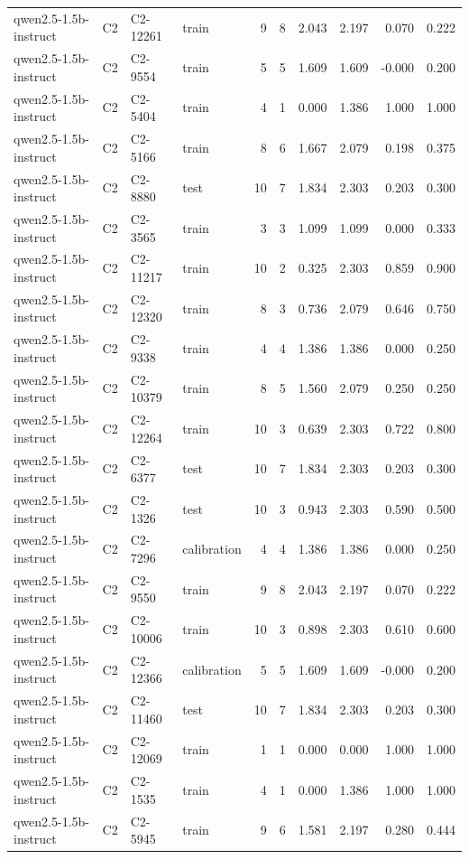 \begin{table}
\begin{tabular}{llllrrrrrr}
qwen2.5-1.5b-instruct & C2 & C2-12261 & train & 9 & 8 & 2.043 & 2.197 & 0.070 & 0.222 \\
qwen2.5-1.5b-instruct & C2 & C2-9554 & train & 5 & 5 & 1.609 & 1.609 & -0.000 & 0.200 \\
qwen2.5-1.5b-instruct & C2 & C2-5404 & train & 4 & 1 & 0.000 & 1.386 & 1.000 & 1.000 \\
qwen2.5-1.5b-instruct & C2 & C2-5166 & train & 8 & 6 & 1.667 & 2.079 & 0.198 & 0.375 \\
qwen2.5-1.5b-instruct & C2 & C2-8880 & test & 10 & 7 & 1.834 & 2.303 & 0.203 & 0.300 \\
qwen2.5-1.5b-instruct & C2 & C2-3565 & train & 3 & 3 & 1.099 & 1.099 & 0.000 & 0.333 \\
qwen2.5-1.5b-instruct & C2 & C2-11217 & train & 10 & 2 & 0.325 & 2.303 & 0.859 & 0.900 \\
qwen2.5-1.5b-instruct & C2 & C2-12320 & train & 8 & 3 & 0.736 & 2.079 & 0.646 & 0.750 \\
qwen2.5-1.5b-instruct & C2 & C2-9338 & train & 4 & 4 & 1.386 & 1.386 & 0.000 & 0.250 \\
qwen2.5-1.5b-instruct & C2 & C2-10379 & train & 8 & 5 & 1.560 & 2.079 & 0.250 & 0.250 \\
qwen2.5-1.5b-instruct & C2 & C2-12264 & train & 10 & 3 & 0.639 & 2.303 & 0.722 & 0.800 \\
qwen2.5-1.5b-instruct & C2 & C2-6377 & test & 10 & 7 & 1.834 & 2.303 & 0.203 & 0.300 \\
qwen2.5-1.5b-instruct & C2 & C2-1326 & test & 10 & 3 & 0.943 & 2.303 & 0.590 & 0.500 \\
qwen2.5-1.5b-instruct & C2 & C2-7296 & calibration & 4 & 4 & 1.386 & 1.386 & 0.000 & 0.250 \\
qwen2.5-1.5b-instruct & C2 & C2-9550 & train & 9 & 8 & 2.043 & 2.197 & 0.070 & 0.222 \\
qwen2.5-1.5b-instruct & C2 & C2-10006 & train & 10 & 3 & 0.898 & 2.303 & 0.610 & 0.600 \\
qwen2.5-1.5b-instruct & C2 & C2-12366 & calibration & 5 & 5 & 1.609 & 1.609 & -0.000 & 0.200 \\
qwen2.5-1.5b-instruct & C2 & C2-11460 & test & 10 & 7 & 1.834 & 2.303 & 0.203 & 0.300 \\
qwen2.5-1.5b-instruct & C2 & C2-12069 & train & 1 & 1 & 0.000 & 0.000 & 1.000 & 1.000 \\
qwen2.5-1.5b-instruct & C2 & C2-1535 & train & 4 & 1 & 0.000 & 1.386 & 1.000 & 1.000 \\
qwen2.5-1.5b-instruct & C2 & C2-5945 & train & 9 & 6 & 1.581 & 2.197 & 0.280 & 0.444 \\

\end{tabular}
\end{table}
